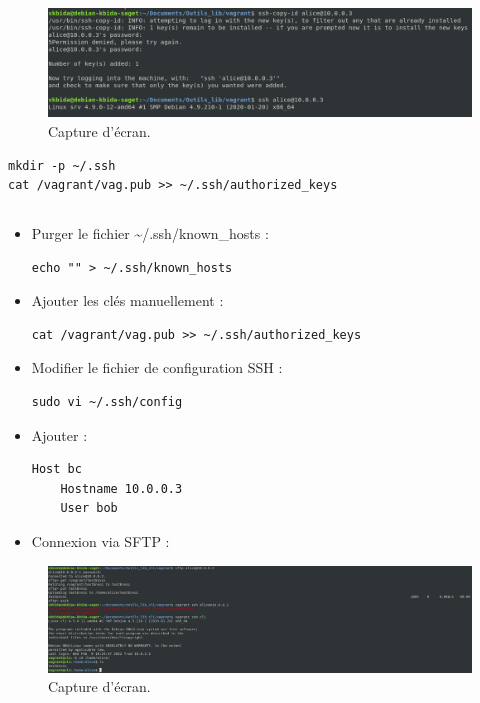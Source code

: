 \documentclass{article}
\begin{document}
\begin{figure}[h]
\centering
\includegraphics[width=\textwidth]{images/q2-2.jpg}
\caption{\label{fig:frog}Capture d'écran.}
\end{figure}


\begin{lstlisting}
mkdir -p ~/.ssh
cat /vagrant/vag.pub >> ~/.ssh/authorized_keys
\end{lstlisting}

\subsection{}

\begin{itemize}
\item Purger le fichier \textasciitilde/.ssh/known\_hosts :
\begin{lstlisting}
echo "" > ~/.ssh/known_hosts
\end{lstlisting}
\item Ajouter les clés manuellement :
\begin{lstlisting}
cat /vagrant/vag.pub >> ~/.ssh/authorized_keys
\end{lstlisting}
\item Modifier le fichier de configuration SSH :
\begin{lstlisting}
sudo vi ~/.ssh/config
\end{lstlisting}
\item Ajouter :

\begin{lstlisting}
Host bc
	Hostname 10.0.0.3
	User bob
\end{lstlisting}
    \item Connexion via SFTP :
\end{itemize}

\begin{figure}[h]
\centering
\includegraphics[width=\textwidth]{images/q2-3-1.jpg}
\caption{\label{fig:frog}Capture d'écran.}
\end{figure}
\end{document}
